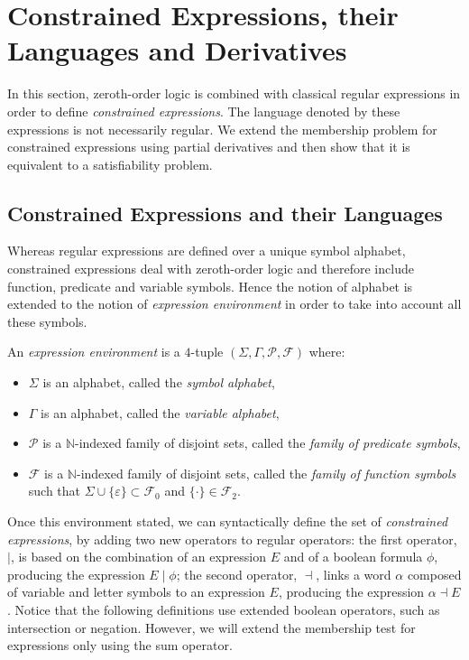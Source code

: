 \documentclass[a4paper]{llncs}
\begin{document}
 
\section{Constrained Expressions, their Languages and Derivatives}\label{sec:cons expr lang and der}

  In this section, zeroth-order logic is combined with classical regular expressions in order to define \emph{constrained expressions}. The language denoted by these expressions is not necessarily regular. We extend the membership problem for constrained expressions using partial derivatives and then show that it is equivalent to a satisfiability problem.

\subsection{Constrained Expressions and their Languages}

  Whereas regular expressions are defined over a unique symbol alphabet, constrained expressions deal with zeroth-order logic and therefore include function, predicate and variable symbols. Hence the notion of alphabet is extended to the notion of \emph{expression environment} in order to take into account
all these symbols.
  
  \begin{definition}
    An \emph{expression environment} is a $4$-tuple $(\Sigma,\Gamma,\mathcal{P},\mathcal{F})$ where:
    \begin{itemize}
      \item $\Sigma$ is an alphabet, called the \emph{symbol alphabet},
      \item $\Gamma$ is an alphabet, called the \emph{variable alphabet},
      \item $\mathcal{P}$ is a $\mathbb{N}$-indexed family of disjoint sets, called the \emph{family of predicate symbols},
      \item $\mathcal{F}$ is a $\mathbb{N}$-indexed family of disjoint sets, called the \emph{family of function symbols} such that $\Sigma\cup\{\varepsilon\}\subset\mathcal{F}_0$ and $\{\cdot\} \in \mathcal{F}_2$.
    \end{itemize}
  \end{definition}
  
  Once this environment stated, we can syntactically define the set of \emph{constrained expressions}, by adding two new operators to regular operators: the first operator, $\mid$, is based on the combination of an expression $E$ and of a boolean formula $\phi$, producing the expression $E\mid \phi$; the second operator, $\dashv$, links a word $\alpha$ composed of variable and letter symbols to an expression $E$, producing the expression $\alpha \dashv E$.
  Notice that the following definitions use extended boolean operators, such as intersection or negation. However, we will extend the membership test for expressions only using the sum operator.
  
\end{document}
